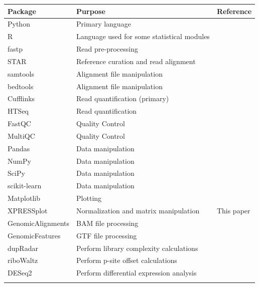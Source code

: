 \documentclass[10pt, oneside]{article}
\begin{document}
\begin{multicols}{2}
\begin{table}[!]
    \centering
{}
\begin{tabular}{p{3cm}p{7.5cm}p{2.4cm}}
 \textbf{Package} & \textbf{Purpose} & \textbf{Reference} \\
 \hline
 Python & Primary language & \\
 \hline
 R & Language used for some statistical modules & \\
 \hline
 fastp & Read pre-processing & \cite{fastp} \\
 \hline
 STAR & Reference curation and read alignment & \cite{star} \\
 \hline
 samtools & Alignment file manipulation & \cite{samtools} \\
 \hline
 bedtools & Alignment file manipulation & \cite{bedtools} \\
 \hline
 Cufflinks & Read quantification (primary) & \cite{cufflinks} \\
 \hline
 HTSeq & Read quantification & \cite{htseq} \\
 \hline
 FastQC & Quality Control & \cite{fastqc} \\
 \hline
 MultiQC & Quality Control & \cite{multiqc} \\
 \hline
 Pandas & Data manipulation & \cite{pandas} \\
 \hline
 NumPy & Data manipulation & \cite{numpy1, numpy2} \\
 \hline
 SciPy & Data manipulation & \cite{scipy} \\
 \hline
 scikit-learn & Data manipulation & \cite{sklearn} \\
 \hline
 Matplotlib & Plotting & \cite{matplotlib} \\
 \hline
 XPRESSplot & Normalization and matrix manipulation & This paper \\
 \hline
 GenomicAlignments & BAM file processing & \cite{genomicalign} \\
 \hline
 GenomicFeatures & GTF file processing & \cite{genomicalign} \\
 \hline
 dupRadar & Perform library complexity calculations & \cite{dupradar} \\
 \hline
 riboWaltz & Perform p-site offset calculations & \cite{ribowaltz} \\
 \hline
 DESeq2 & Perform differential expression analysis & \cite{deseq2} \\
 \label{Tab:software_pipe}
\end{tabular}
\end{table}


\end{multicols}
\end{document}
